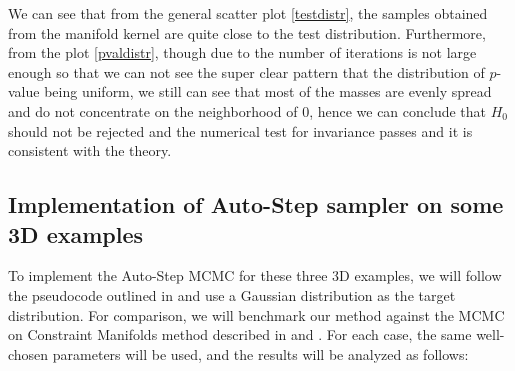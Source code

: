 \documentclass{article}
\begin{document}



    


We can see that from the general scatter plot \ref{testdistr}, the samples obtained from the manifold kernel are quite close to the test distribution. Furthermore, from the plot \ref{pvaldistr}, though due to the number of iterations is not large enough so that we can not see the super clear pattern that the distribution of $p$-value being uniform, we still can see that most of the masses are evenly spread and do not concentrate on the neighborhood of $0$, hence we can conclude that $H_0$ should not be rejected and the numerical test for invariance passes and it is consistent with the theory.



\subsection{Implementation of Auto-Step sampler on some 3D examples}
To implement the Auto-Step MCMC for these three 3D examples, we will follow the pseudocode outlined in \cite{autostep} and use a Gaussian distribution as the target distribution. For comparison, we will benchmark our method against the MCMC on Constraint Manifolds method described in \cite{manifoldparent} and \cite{manifoldchild}. For each case, the same well-chosen parameters will be used, and the results will be analyzed as follows:
\end{document}
